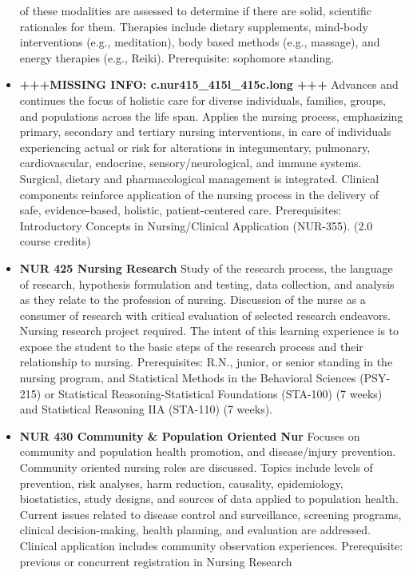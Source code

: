 \documentclass[
  letterpaper,
]{scrbook}
\begin{document}
\begin{itemize}
  of these modalities are assessed to determine if there are solid,
  scientific rationales for them. Therapies include dietary supplements,
  mind-body interventions (e.g., meditation), body based methods (e.g.,
  massage), and energy therapies (e.g., Reiki). Prerequisite: sophomore
  standing.
\item
  \textbf{+++MISSING INFO: c.nur415\_415l\_415c.long +++} Advances and
  continues the focus of holistic care for diverse individuals,
  families, groups, and populations across the life span. Applies the
  nursing process, emphasizing primary, secondary and tertiary nursing
  interventions, in care of individuals experiencing actual or risk for
  alterations in integumentary, pulmonary, cardiovascular, endocrine,
  sensory/neurological, and immune systems. Surgical, dietary and
  pharmacological management is integrated. Clinical components
  reinforce application of the nursing process in the delivery of safe,
  evidence-based, holistic, patient-centered care. Prerequisites:
  Introductory Concepts in Nursing/Clinical Application (NUR-355). (2.0
  course credits)
\item
  \textbf{NUR 425 Nursing Research} Study of the research process, the
  language of research, hypothesis formulation and testing, data
  collection, and analysis as they relate to the profession of nursing.
  Discussion of the nurse as a consumer of research with critical
  evaluation of selected research endeavors. Nursing research project
  required. The intent of this learning experience is to expose the
  student to the basic steps of the research process and their
  relationship to nursing. Prerequisites: R.N., junior, or senior
  standing in the nursing program, and Statistical Methods in the
  Behavioral Sciences (PSY-215) or Statistical Reasoning-Statistical
  Foundations (STA-100) (7 weeks) and Statistical Reasoning IIA
  (STA-110) (7 weeks).
\item
  \textbf{NUR 430 Community \& Population Oriented Nur} Focuses on
  community and population health promotion, and disease/injury
  prevention. Community oriented nursing roles are discussed. Topics
  include levels of prevention, risk analyses, harm reduction,
  causality, epidemiology, biostatistics, study designs, and sources of
  data applied to population health. Current issues related to disease
  control and surveillance, screening programs, clinical
  decision-making, health planning, and evaluation are addressed.
  Clinical application includes community observation experiences.
  Prerequisite: previous or concurrent registration in Nursing Research

\end{itemize}
\end{document}
